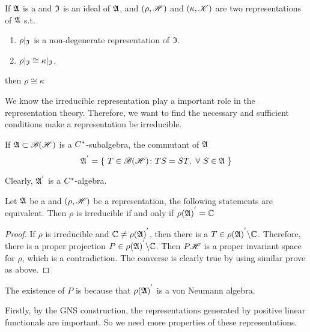 \documentclass[a4paper,11pt]{report}
\begin{document}
\begin{cor}
	If $\mathfrak{A}$ is a \Cs and $\mathfrak{I}$ is an ideal of $\mathfrak{A}$, and $(\rho,\mathscr{H})$ and $(\kappa,\mathscr{K})$ are two representations of $\mathfrak{A}$ s.t.
	\begin{enumerate}[label=\arabic*)]
		\item $\rho|_{\mathfrak{I}}$ is a non-degenerate representation of $\mathfrak{I}$.
		\item $\rho|_{\mathfrak{I}} \cong \kappa|_{\mathfrak{I}}$.
	\end{enumerate}
	then $\rho \cong \kappa$
\end{cor}


We know the irreducible representation play a important role in the representation theory. Therefore, we want to find the necessary and sufficient conditions make a representation be irreducible.

\begin{defn}
	If $\mathfrak{A} \subset \mathscr{B(H)}$ is a $C^{*}$-subalgebra, the commutant of $\mathfrak{A}$
	\begin{equation*}
		{\mathfrak{A}}^{'} = \{~T \in \mathscr{B(H)} \colon TS=ST,~\forall~S \in \mathfrak{A}~\}
	\end{equation*}
\end{defn}
\begin{rem}
	Clearly, ${\mathfrak{A}}^{'}$ is a $C^{*}$-algebra.
\end{rem}

\begin{thm}
	Let $\mathfrak{A}$ be a \Cs and $(\rho,\mathscr{H})$ be a representation, the following statements are equivalent. Then $\rho$ is irreducible if and only if ${\rho(\mathfrak{A})}^{'} = \mathbb{C}$
\end{thm}
\begin{proof}
	If $\rho$ is irreducible and $\mathbb{C} \neq {\rho(\mathfrak{A})}^{'}$, then there is a $T \in {\rho(\mathfrak{A})}^{'} \backslash \mathbb{C}$. Therefore, there is a proper projection $P \in {\rho(\mathfrak{A})}^{'} \backslash \mathbb{C}$. Then $P\mathscr{H}$ is a proper invariant space for $\rho$, which is a contradiction. The converse is clearly true by using similar prove as above.
\end{proof}
\begin{rem}
	The existence of $P$ is because that ${\rho(\mathfrak{A})}^{'}$ is a von Neumann algebra.
\end{rem}

Firstly, by the GNS construction, the representations generated by positive linear functionals are important. So we need more properties of these representations.
\end{document}
